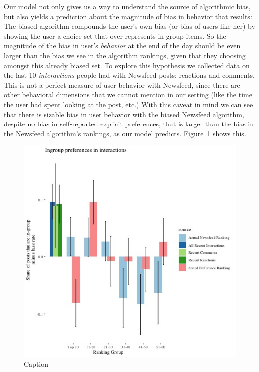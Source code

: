 \documentclass[12pt,letterpaper]{article}
\begin{document}
Our model not only gives us a way to understand the source of algorithmic bias, but also yields a prediction about the magnitude of bias in behavior that results: The biased algorithm compounds the user's own bias (or bias of users like her) by showing the user a choice set that over-represents in-group items. So the magnitude of the bias in user's \emph{behavior} at the end of the day should be even larger than the bias we see in the algorithm rankings, given that they choosing amongst this already biased set. To explore this hypothesis we collected data on the last 10 \emph{interactions} people had with Newsfeed posts: reactions and comments. This is not a perfect measure of user behavior with Newsfeed, since there are other behavioral dimensions that we cannot mention in our setting (like the time the user had spent looking at the post, etc.) With this caveat in mind we can see that there is sizable bias in user behavior with the biased Newsfeed algorithm, despite no bias in self-reported explicit preferences, that is larger than the bias in the Newsfeed algorithm's rankings, as our model predicts.  Figure~\ref{fig:behavior} shows this. 
 
\begin{figure}[!h]
    \centering
    \includegraphics[scale=.5]{Output/Graphs/Audit/Interactions/US preferences reactions and actual rankings above base rate.jpg}
    \caption{Caption}
    \label{fig:behavior}
\end{figure}
\end{document}
